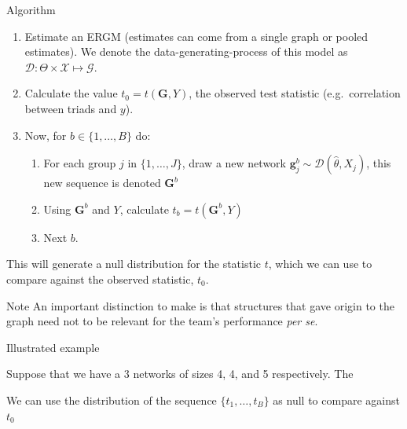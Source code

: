 \documentclass[10pt,ignorenonframetext,aspectratio=169,]{beamer}
\newcommand{\Graph}{\mathbf{G}}
\newcommand{\graph}{\mathbf{g}}
\newcommand{\GRAPH}{\mathcal{G}}
\newcommand{\depvar}{y}
\begin{document}
\begin{frame}{Algorithm}
\protect\hypertarget{algorithm}{}

\begin{enumerate}
\item
  Estimate an ERGM (estimates can come from a single graph or pooled
  estimates). We denote the data-generating-process of this model as
  \(\mathcal{D}: \Theta\times \mathcal{X}\mapsto \GRAPH\).\pause
\item
  Calculate the value \(t_0 = t(\Graph, Y)\), the observed test
  statistic (e.g.~correlation between triads and \(\depvar\)).\pause
\item
  Now, for \(b \in \{1, \dots, B\}\) do:\pause

  \begin{enumerate}
  \item
    For each group \(j\) in \(\{1, \dots, J\}\), draw a new network
    \(\graph_j^b\sim\mathcal{D}(\hat{\theta}, X_j)\), this new sequence
    is denoted \(\Graph^b\)\pause
  \item
    Using \(\Graph^b\) and \(Y\), calculate
    \(t_b = t(\Graph^b, Y)\)\pause
  \item
    Next \(b\).\pause
  \end{enumerate}
\end{enumerate}

This will generate a null distribution for the statistic \(t\), which we
can use to compare against the observed statistic, \(t_0\).\pause

\alert{Note} An important distinction to make is that structures that
gave origin to the graph need not to be relevant for the team's
performance \emph{per se}.

\end{frame}

\begin{frame}{Illustrated example}
\protect\hypertarget{illustrated-example}{}

Suppose that we have a 3 networks of sizes 4, 4, and 5 respectively. The

\footnotesize

\def\svgwidth{.8\linewidth}
\begin{figure}
\centering

\end{figure}

\normalsize

We can use the distribution of the sequence \(\{t_1, \dots, t_B\}\) as
null to compare against \(t_0\)

\end{frame}
\end{document}

